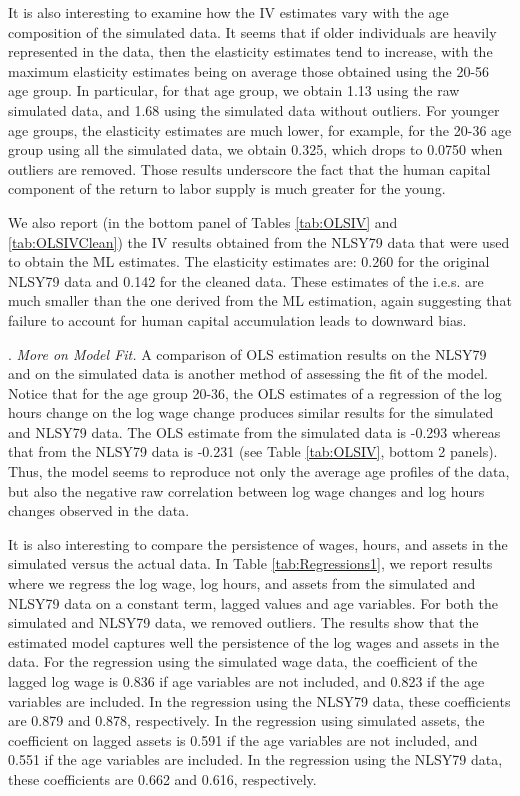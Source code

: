 \documentclass[\econtexRoot/ImaiKeane]{subfiles}
\begin{document}
      It is also interesting to examine how the IV estimates vary with the age composition of the simulated data. It seems that if older individuals are heavily represented in the data, then the elasticity estimates tend to increase, with the maximum elasticity estimates being on average those obtained using the 20-56 age group. In particular, for that age group, we obtain 1.13 using the raw simulated data, and 1.68 using the simulated data without outliers. For younger age groups, the elasticity estimates are much lower, for example, for the 20-36 age group using all the simulated data, we obtain 0.325, which drops to 0.0750 when outliers are removed. Those results underscore the fact that the human capital component of the return to labor supply is much greater for the young. \par
      We also report (in the bottom panel of Tables \ref{tab:OLSIV} and \ref{tab:OLSIVClean}) the IV results obtained from the NLSY79 data that were used to obtain the ML estimates. The elasticity estimates are: 0.260 for the original NLSY79 data and 0.142 for the cleaned data. These estimates of the i.e.s. are much smaller than the one derived from the ML estimation, again suggesting that failure to account for human capital accumulation leads to downward bias.\par
{}.     \textit{More on Model Fit.}     A comparison of OLS estimation results on the NLSY79 and on the simulated data is another method of assessing the fit of the model. Notice that for the age group 20-36, the OLS estimates of a regression of the log hours change on the log wage change produces similar results for the simulated and NLSY79 data. The OLS estimate from the simulated data is -0.293 whereas that from the NLSY79 data is -0.231 (see Table \ref{tab:OLSIV}, bottom 2 panels). Thus, the model seems to reproduce not only the average age profiles of the data, but also the negative raw correlation between log wage changes and log hours changes observed in the data. \par
      
      
      It is also interesting to compare the persistence of wages, hours, and assets in the simulated versus the actual data. In Table \ref{tab:Regressions1}, we report results where we regress the log wage, log hours, and assets from the simulated and NLSY79 data on a constant term, lagged values and age variables. For both the simulated and NLSY79 data, we removed outliers. The results show that the estimated model captures well the persistence of the log wages and assets in the data. For the regression using the simulated wage data, the coefficient of the lagged log wage is 0.836 if age variables are not included, and 0.823 if the age variables are included. In the regression using the NLSY79 data, these coefficients are 0.879 and 0.878, respectively. In the regression using simulated assets, the coefficient on lagged assets is 0.591 if the age variables are not included, and 0.551 if the age variables are included. In the regression using the NLSY79 data, these coefficients are 0.662 and 0.616, respectively. \par
\end{document}
